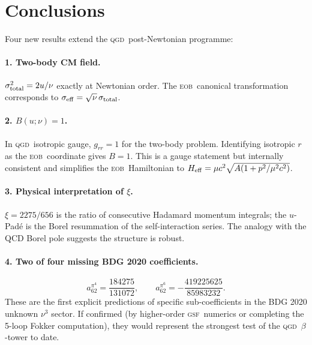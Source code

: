 \documentclass[11pt,a4paper]{article}
\theoremstyle{plain}
\theoremstyle{remark}
\newcommand{\QGD}{\textsc{qgd}}
\newcommand{\EOB}{\textsc{eob}}
\newcommand{\GSF}{\textsc{gsf}}
\begin{document}
\section{Conclusions}

Four new results extend the \QGD\ post-Newtonian programme:

\paragraph{1. Two-body CM field.}
$\sigma_{\rm total}^2 = 2u/\nu$ exactly at Newtonian order.
The \EOB\ canonical transformation corresponds to $\sigma_{\rm eff} = \sqrt{\nu}\,\sigma_{\rm total}$.

\paragraph{2. $B(u;\nu)=1$.}
In \QGD\ isotropic gauge, $g_{rr}=1$ for the two-body problem.
Identifying isotropic $r$ as the \EOB\ coordinate gives $B=1$.
This is a gauge statement but internally consistent and simplifies
the \EOB\ Hamiltonian to $H_{\rm eff} = \mu c^2\sqrt{A(1+p^2/\mu^2c^2)}$.

\paragraph{3. Physical interpretation of $\xi$.}
$\xi = 2275/656$ is the ratio of consecutive Hadamard momentum integrals;
the $u$-Pad\'e is the Borel resummation of the self-interaction series.
The analogy with the QCD Borel pole suggests the structure is robust.

\paragraph{4. Two of four missing BDG 2020 coefficients.}
\begin{equation*}
  a_{62}^{\pi^4} = \frac{184275}{131072}, \qquad
  a_{62}^{\pi^6} = -\frac{419225625}{85983232}.
\end{equation*}
These are the first explicit predictions of specific sub-coefficients
in the BDG 2020 unknown $\nu^3$ sector.
If confirmed (by higher-order \GSF\ numerics or completing the 5-loop
Fokker computation), they would represent the strongest test of the
\QGD\ $\beta$-tower to date.
\end{document}
